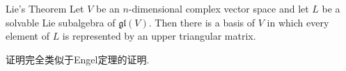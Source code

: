 \documentclass[../main.tex]{subfiles}
\begin{document}
\begin{theorem}{Lie's Theorem}{}
Let $V$ be an $n$-dimensional complex vector space and let $L$ be a solvable Lie subalgebra of $\mathfrak{gl}(V)$. Then there is a basis of $V$ in which every element of $L$ is represented by an upper triangular matrix.
\end{theorem}
\begin{proofsketch}
  证明完全类似于Engel定理的证明.
\end{proofsketch}
\end{document}
